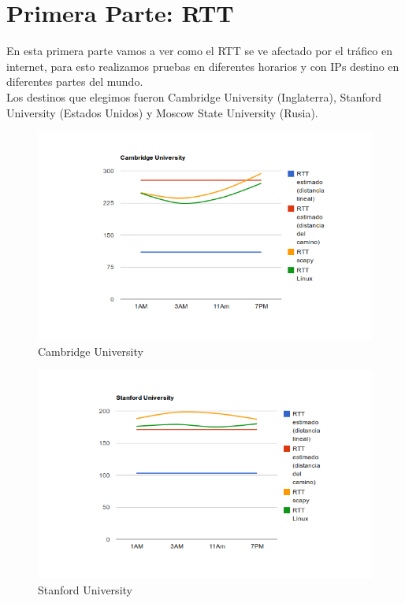 \newpage
\section{Primera Parte: RTT}
\indent En esta primera parte vamos a ver como el RTT se ve afectado por el tráfico en internet, para esto realizamos pruebas en diferentes horarios y con IPs destino en diferentes partes del mundo.\\

\indent Los destinos que elegimos fueron Cambridge University (Inglaterra), Stanford University (Estados Unidos) y Moscow State University (Rusia).\\

\begin{figure}[h!]
    \centering
    \includegraphics[width=400pt]{cambridge.png}
    \caption{Cambridge University}
    \label{fig:cambridge:count}
\end{figure}

\begin{figure}[h!]
    \centering
    \includegraphics[width=400pt]{stanford.png}
    \caption{Stanford University}
    \label{fig:stanford:count}
\end{figure}

